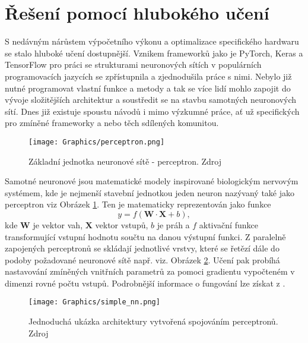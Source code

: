 \documentclass[czech, bc, kky, he, iso690numb]{fasthesis}
\begin{document}
        \section{Řešení pomocí hlubokého učení}\label{sec:reseni_deep_learning}
        	S nedávným nárůstem výpočetního výkonu a optimalizace specifického hardwaru se stalo hluboké učení dostupnější. Vznikem frameworků jako je PyTorch, Keras a TensorFlow pro práci se strukturami neuronových sítích v populárních programovacích jazycích se zpřístupnila a zjednodušila práce s nimi. Nebylo již nutné programovat vlastní funkce a metody a tak se více lidí mohlo zapojit do vývoje složitějších architektur a soustředit se na stavbu samotných neuronových sítí. Dnes již existuje spoustu návodů i mimo výzkumné práce, ať už specifických pro zmíněné frameworky a nebo těch sdílených komunitou.
            
	            \begin{figure}[h]
	            	\centering
	            	\texttt{[image: Graphics/perceptron.png]}
	            	\caption{Základní jednotka neuronové sítě - perceptron. Zdroj \cite{neural_networks_background_02}}
	            	\label{pic:perceptron}
	            \end{figure}
	            
            Samotné neuronové jsou matematické modely inspirované biologickým nervovým systémem, kde je nejmenší stavební jednotkou jeden neuron nazývaný také jako perceptron viz Obrázek \ref{pic:perceptron}. Ten je matematicky reprezentován jako funkce 
            \[y=f(\mathbf{W}\cdot\mathbf{X} + b),\]
            kde \(\mathbf{W}\) je vektor vah, \(\mathbf{X}\) vektor vstupů, \(b\) je práh a \(f\) aktivační funkce transformující vstupní hodnotu součtu na danou výstupní funkci. Z paralelně zapojených perceptronů se skládají jednotlivé vrstvy, které se řetězí dále do podoby požadované neuronové sítě např. viz. Obrázek \ref{pic:basic_nn}. Učení pak probíhá nastavování zmíněných vnitřních parametrů za pomoci gradientu vypočteném v dimenzi rovné počtu vstupů. Podrobnější informace o fungování lze získat z \cite{neural_networks_background_01,neural_networks_background_02}.
            
	            \begin{figure}[h]
	            	\centering
	            	\texttt{[image: Graphics/simple\_nn.png]}
	            	\caption{Jednoduchá ukázka architektury vytvořená spojováním perceptronů. Zdroj \cite{neural_networks_background_02}}
	            	\label{pic:basic_nn}
	            \end{figure}
            
\end{document}
